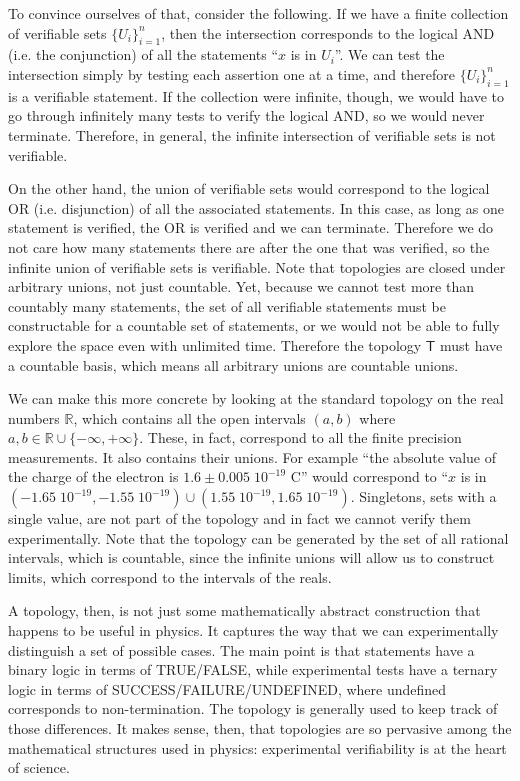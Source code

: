 \documentclass[12pt]{iopart}
\begin{document}
To convince ourselves of that, consider the following. If we have a finite collection of verifiable sets $\{U_i\}_{i=1}^n$, then the intersection corresponds to the logical AND (i.e. the conjunction) of all the statements ``$x$ is in $U_i$''. We can test the intersection simply by testing each assertion one at a time, and therefore $\{U_i\}_{i=1}^n$ is a verifiable statement. If the collection were infinite, though, we would have to go through infinitely many tests to verify the logical AND, so we would never terminate. Therefore, in general, the infinite intersection of verifiable sets is not verifiable.

On the other hand, the union of verifiable sets would correspond to the logical OR (i.e. disjunction) of all the associated statements. In this case, as long as one statement is verified, the OR is verified and we can terminate. Therefore we do not care how many statements there are after the one that was verified, so the infinite union of verifiable sets is verifiable. Note that topologies are closed under arbitrary unions, not just countable. Yet, because we cannot test more than countably many statements, the set of all verifiable statements must be constructable for a countable set of statements, or we would not be able to fully explore the space even with unlimited time. Therefore the topology $\mathsf{T}$ must have a countable basis, which means all arbitrary unions are countable unions. 

We can make this more concrete by looking at the standard topology on the real numbers $\mathbb{R}$, which contains all the open intervals $(a,b)$ where $a,b \in \mathbb{R}\cup\{-\infty, +\infty\}$. These, in fact, correspond to all the finite precision measurements. It also contains their unions. For example ``the absolute value of the charge of the electron is $1.6 \pm 0.005\;10^{-19}$ C'' would correspond to ``$x$ is in $(-1.65 \;10^{-19}, -1.55 \;10^{-19})\cup(1.55 \;10^{-19},1.65 \;10^{-19})$. Singletons, sets with a single value, are not part of the topology and in fact we cannot verify them experimentally. Note that the topology can be generated by the set of all rational intervals, which is countable, since the infinite unions will allow us to construct limits, which correspond to the intervals of the reals.

A topology, then, is not just some mathematically abstract construction that happens to be useful in physics. It captures the way that we can experimentally distinguish a set of possible cases. The main point is that statements have a binary logic in terms of TRUE/FALSE, while experimental tests have a ternary logic in terms of SUCCESS/FAILURE/UNDEFINED, where undefined corresponds to non-termination. The topology is generally used to keep track of those differences. It makes sense, then, that topologies are so pervasive among the mathematical structures used in physics: experimental verifiability is at the heart of science.
\end{document}
